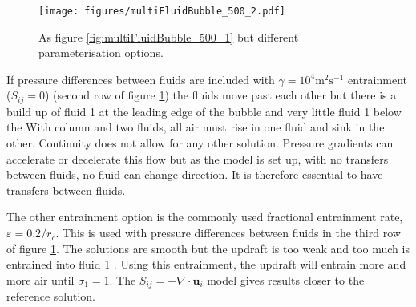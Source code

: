 \documentclass[draft]{agujournal2019}
\begin{document}
\begin{figure}
\noindent
\texttt{[image: figures/multiFluidBubble\_500\_2.pdf]}
\caption{As figure \ref{fig:multiFluidBubble_500_1} but different parameterisation options.
\label{fig:multiFluidBubble_500_2}}
\end{figure}

If
{pressure differences between fluids are included}
with $\gamma=10^{4}\text{m}^{2}\text{s}^{-1}$
entrainment ($S_{ij}=0$) (second row of figure \ref{fig:multiFluidBubble_500_2})
the fluids move past each other but there is 
{a build up of fluid 1 at the leading edge of the bubble and very little}
fluid 1 below the 
With  column and
two fluids, all air must rise in one fluid and sink in the other.
Continuity does not allow for any other solution. Pressure gradients
can accelerate or decelerate this flow but as the model is set up,
with no transfers between fluids, no fluid can change direction. It
is therefore essential to have transfers between fluids.

The other entrainment option is the commonly used fractional entrainment
rate, $\varepsilon=0.2/r_{c}$. This is used  with pressure differences between fluids in the third row of figure \ref{fig:multiFluidBubble_500_2}.
{The solutions are smooth}
but the  updraft is too
weak and too much is entrained into fluid 1 .
Using this entrainment, the updraft will entrain more and more air until $\sigma_{1}=1$. The $S_{ij}=-\nabla\cdot\mathbf{u}_{i}$ model gives
{results closer to the reference solution.}
\end{document}
